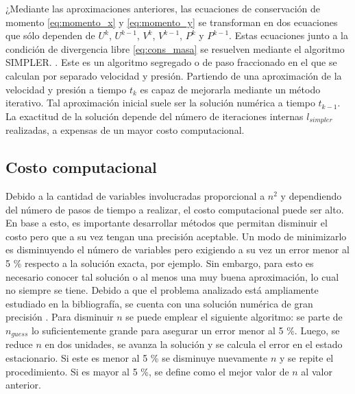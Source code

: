 \documentclass[aps,prb,twocolumn,superscriptaddress,floatfix,longbibliography,10pt]{revtex4-2}
\newif\ifptitle
\newif\ifpnumber
\newcounter{para}
\newcommand\ptitle[1]{\par\refstepcounter{para}
{\ifpnumber{\noindent\textcolor{lightgray}{\textbf{\thepara}}\indent}\fi}
{\ifptitle{\textbf{[{#1}]}}\fi}}
\begin{document}
\ptitle{Algoritmo simpler simplificadamente}
¿Mediante las aproximaciones anteriores, las ecuaciones de conservación de momento \ref{eq:momento_x} y \ref{eq:momento_y} se transforman en dos ecuaciones que sólo dependen de $U^k$, $U^{k-1}$, $V^k$, $V^{k-1}$, $P^k$ y $P^{k-1}$. Estas ecuaciones junto a la condición de divergencia libre \ref{eq:cons_masa} se resuelven mediante el algoritmo SIMPLER. \cite{Patankar}. Este es un algoritmo segregado o de paso fraccionado en el que se calculan por separado velocidad y presión. Partiendo de una aproximación de la velocidad y presión a tiempo $t_k$ es capaz de mejorarla mediante un método iterativo. Tal aproximación inicial suele ser la solución numérica a tiempo $t_{k-1}$. La exactitud de la solución depende del número de iteraciones internas $l_{simpler}$ realizadas, a expensas de un mayor costo computacional.



\subsection{Costo computacional}

\ptitle{Costo computacional y elección de $n$}
Debido a la cantidad de variables involucradas proporcional a $n^2$ y dependiendo del número de pasos de tiempo a realizar, el costo computacional puede ser alto. En base a esto, es importante desarrollar métodos que permitan disminuir el costo pero que a su vez tengan una precisión aceptable. Un modo de minimizarlo es disminuyendo el número de variables pero exigiendo a su vez un error menor al 5 \% respecto a la solución exacta, por ejemplo. Sin embargo, para esto es necesario conocer tal solución o al menos una muy buena aproximación, lo cual no siempre se tiene. Debido a que el problema analizado está ampliamente estudiado en la bibliografía, se cuenta con una solución numérica de gran precisión \cite{Guia1982}. Para disminuir $n$ se puede emplear el siguiente algoritmo: se parte de $n_{guess}$ lo suficientemente grande para asegurar un error menor al 5 \%. Luego, se reduce $n$ en dos unidades, se avanza la solución y se calcula el error en el estado estacionario. Si este es menor al 5 \% se disminuye nuevamente $n$ y se repite el procedimiento. Si es mayor al 5 \%, se define como el mejor valor de $n$ al valor anterior.
\end{document}
